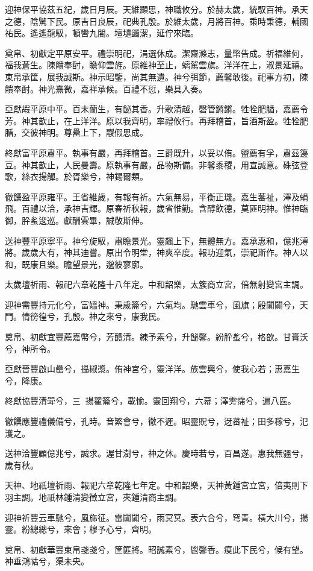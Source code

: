\begin{pinyinscope}
迎神保平協茲五紀，歲日月辰。天維顯思，神職攸分。於赫太歲，統馭百神。承天之德，陰騭下民。原吉日良辰，祀典孔殷。於維太歲，月將百神。乘時秉德，輔國祐民。遙遙龍馭，頓轡九閽。壇壝蠲潔，延佇來臨。

奠帛、初獻定平原安平。禮崇明祀，涓選休成。潔齋滌志，量幣告成。祈福維何，福我蒼生。陳饋奉酎，瞻仰雲旌。原維神至止，螭駕雲旗。洋洋在上，淑景延禧。束帛承筐，展我誠斯。神示昭鑒，尚其無遺。神兮弭節，薦馨敢後。祀事方初，陳饋奉酎。神光熹微，嘉祥承候。百禮不愆，樂具入奏。

亞獻嘏平原中平。百末蘭生，有飶其香。升歌清越，磬管鏘鏘。牲牷肥腯，嘉薦令芳。神其歆止，在上洋洋。原以我齊明，率禮攸行。再拜稽首，旨酒斯盈。牲牷肥腯，交彼神明。尊罍上下，鬷假思成。

終獻富平原肅平。執事有嚴，再拜稽首。三爵既升，以妥以侑。盥薦有孚，肅茲籩豆。神其歆止，人民曼壽。原執事有嚴，品物斯備。非馨黍稷，用宣誠意。硃弦登歌，絲衣揚觶。於胥樂兮，神錫爾類。

徹饌盈平原雍平。王省維歲，有報有祈。六氣無易，平衡正璣。嘉生蕃祉，澤及蜎飛。百禮以洽，承神吉輝。原春祈秋報，歲省惟勤。含醇飲德，莫匪明神。惟神臨御，肸蚃逡巡。獻酬雲畢，誠敬斯伸。

送神豐平原寧平。神兮旋馭，肅瞻景光。靈飆上下，無體無方。嘉承惠和，億兆溥將。歲歲大有，神其迪嘗。原出令明堂，神爽卒度。報功迎氣，崇祀斯作。神人以和，既康且樂。瞻望景光，邈彼寥廓。

太歲壇祈雨、報祀六章乾隆十八年定。中和韶樂，太簇商立宮，倍無射變宮主調。

迎神需豐持元化兮，富媼神。秉歲籥兮，六氣均。馳雲車兮，風旗；殷闐闐兮，天門。情徬徨兮，孔殷。神之來兮，康我民。

奠帛、初獻宜豐薦嘉幣兮，芳醴清。練予素兮，升飶馨。紛肸蚃兮，格歆。甘膏沃兮，神所令。

亞獻晉豐啟山罍兮，攝椒漿。侑神宮兮，靈洋洋。族雲興兮，使我心若；惠嘉生兮，降康。

終獻協豐清斝兮，三；揚翟籥兮，載愉。靈回翔兮，六幕；澤雱霈兮，遍八區。

徹饌應豐禮儀備兮，孔時。音繁會兮，徹不遲。昭靈貺兮，迓蕃祉；田多稼兮，氾濩之。

送神洽豐顧億兆兮，誠求。渥甘澍兮，神之休。慶時若兮，百昌遂。惠我無疆兮，歲有秋。

天神、地祇壇祈雨、報祀六章乾隆七年定。中和韶樂，天神黃鍾宮立宮，倍夷則下羽主調。地祇林鍾清變徵立宮，夾鍾清商主調。

迎神祈豐云車馳兮，風旆征。雷闐闐兮，雨冥冥。表六合兮，穹青。橫大川兮，揚靈。紛總總兮，來會；穆予心兮，齊明。

奠帛、初獻華豐束帛戔戔兮，筐篚將。昭誠素兮，鬯馨香。瘼此下民兮，候有望。神垂鴻祜兮，渠未央。


\end{pinyinscope}
